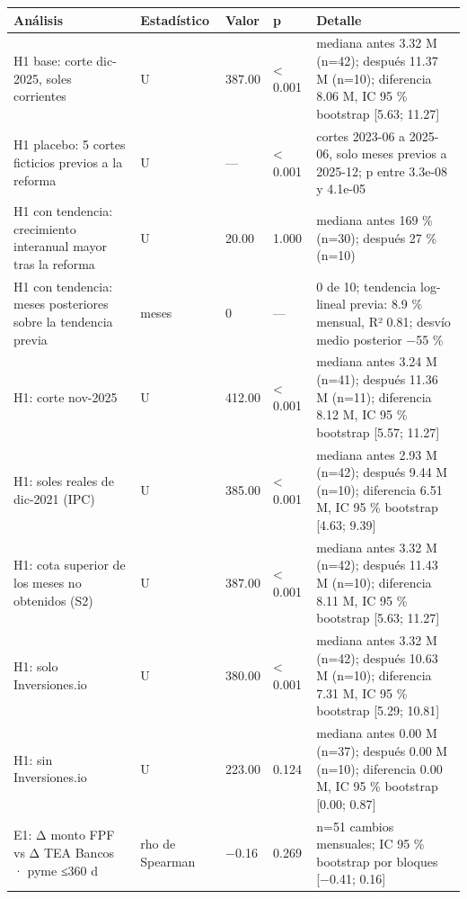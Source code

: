 \begin{tabularx}{\linewidth}{>{\hsize=1.481\hsize\RaggedRight\arraybackslash\hspace{0pt}}X>{\hsize=0.617\hsize\Centering\arraybackslash\hspace{0pt}}X>{\hsize=0.494\hsize\RaggedLeft\arraybackslash\hspace{0pt}}X>{\hsize=0.432\hsize\RaggedLeft\arraybackslash\hspace{0pt}}X>{\hsize=1.975\hsize\RaggedRight\arraybackslash\hspace{0pt}}X}
\toprule
Análisis & Estadístico & Valor & p & Detalle \\
\midrule
H1 base: corte dic-2025, soles corrientes & U & 387.00 & < 0.001 & mediana antes 3.32 M (n=42); después 11.37 M (n=10); diferencia 8.06 M, IC 95 \% bootstrap [5.63; 11.27] \\
H1 placebo: 5 cortes ficticios previos a la reforma & U & — & < 0.001 & cortes 2023-06 a 2025-06, solo meses previos a 2025-12; p entre 3.3e-08 y 4.1e-05 \\
H1 con tendencia: crecimiento interanual mayor tras la reforma & U & 20.00 & 1.000 & mediana antes 169 \% (n=30); después 27 \% (n=10) \\
H1 con tendencia: meses posteriores sobre la tendencia previa & meses & 0 & — & 0 de 10; tendencia log-lineal previa: 8.9 \% mensual, R² 0.81; desvío medio posterior −55 \% \\
H1: corte nov-2025 & U & 412.00 & < 0.001 & mediana antes 3.24 M (n=41); después 11.36 M (n=11); diferencia 8.12 M, IC 95 \% bootstrap [5.57; 11.27] \\
H1: soles reales de dic-2021 (IPC) & U & 385.00 & < 0.001 & mediana antes 2.93 M (n=42); después 9.44 M (n=10); diferencia 6.51 M, IC 95 \% bootstrap [4.63; 9.39] \\
H1: cota superior de los meses no obtenidos (S2) & U & 387.00 & < 0.001 & mediana antes 3.32 M (n=42); después 11.43 M (n=10); diferencia 8.11 M, IC 95 \% bootstrap [5.63; 11.27] \\
H1: solo Inversiones.io & U & 380.00 & < 0.001 & mediana antes 3.32 M (n=42); después 10.63 M (n=10); diferencia 7.31 M, IC 95 \% bootstrap [5.29; 10.81] \\
H1: sin Inversiones.io & U & 223.00 & 0.124 & mediana antes 0.00 M (n=37); después 0.00 M (n=10); diferencia 0.00 M, IC 95 \% bootstrap [0.00; 0.87] \\
E1: Δ monto FPF vs Δ TEA Bancos · pyme ≤360 d & rho de Spearman & −0.16 & 0.269 & n=51 cambios mensuales; IC 95 \% bootstrap por bloques [−0.41; 0.16] \\

\end{tabularx}
